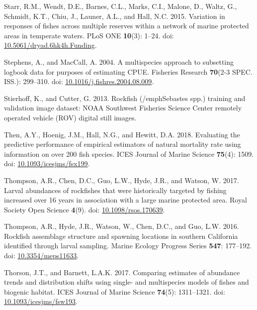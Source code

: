 \documentclass[
  english,
  a4paper,
]{article}
\newlength{\cslhangindent}
\newlength{\cslentryspacingunit} %
\newenvironment{CSLReferences}[2] %
 {%
  \setlength{\parindent}{0pt}
  \ifodd #1
  \let\oldpar\par
  \def\par{\hangindent=\cslhangindent\oldpar}
  \fi
  \setlength{\parskip}{#2\cslentryspacingunit}
 }%
 {}
\begin{document}
\begin{CSLReferences}{1}{0}
\leavevmode{}%
Starr, R.M., Wendt, D.E., Barnes, C.L., Marks, C.I., Malone, D., Waltz, G., Schmidt, K.T., Chiu, J., Launer, A.L., and Hall, N.C. 2015. {Variation in responses of fishes across multiple reserves within a network of marine protected areas in temperate waters}. PLoS ONE \textbf{10}(3): 1--24. doi: \href{https://doi.org/10.5061/dryad.6hk4h.Funding}{10.5061/dryad.6hk4h.Funding}.

\leavevmode{}%
Stephens, A., and MacCall, A. 2004. {A multispecies approach to subsetting logbook data for purposes of estimating CPUE}. Fisheries Research \textbf{70}(2-3 SPEC. ISS.): 299--310. doi: \href{https://doi.org/10.1016/j.fishres.2004.08.009}{10.1016/j.fishres.2004.08.009}.

\leavevmode{}%
Stierhoff, K., and Cutter, G. 2013. {Rockfish (/emph{Sebastes spp.}) training and validation image dataset: NOAA Southwest Fisheries Science Center remotely operated vehicle (ROV) digital still images.}

\leavevmode{}%
Then, A.Y., Hoenig, J.M., Hall, N.G., and Hewitt, D.A. 2018. {Evaluating the predictive performance of empirical estimators of natural mortality rate using information on over 200 fish species}. ICES Journal of Marine Science \textbf{75}(4): 1509. doi: \href{https://doi.org/10.1093/icesjms/fsx199}{10.1093/icesjms/fsx199}.

\leavevmode{}%
Thompson, A.R., Chen, D.C., Guo, L.W., Hyde, J.R., and Watson, W. 2017. {Larval abundances of rockfishes that were historically targeted by fishing increased over 16 years in association with a large marine protected area}. Royal Society Open Science \textbf{4}(9). doi: \href{https://doi.org/10.1098/rsos.170639}{10.1098/rsos.170639}.

\leavevmode{}%
Thompson, A.R., Hyde, J.R., Watson, W., Chen, D.C., and Guo, L.W. 2016. {Rockfish assemblage structure and spawning locations in southern California identified through larval sampling}. Marine Ecology Progress Series \textbf{547}: 177--192. doi: \href{https://doi.org/10.3354/meps11633}{10.3354/meps11633}.

\leavevmode{}%
Thorson, J.T., and Barnett, L.A.K. 2017. {Comparing estimates of abundance trends and distribution shifts using single- and multispecies models of fishes and biogenic habitat}. ICES Journal of Marine Science \textbf{74}(5): 1311--1321. doi: \href{https://doi.org/10.1093/icesjms/fsw193}{10.1093/icesjms/fsw193}.


\end{CSLReferences}
\end{document}
